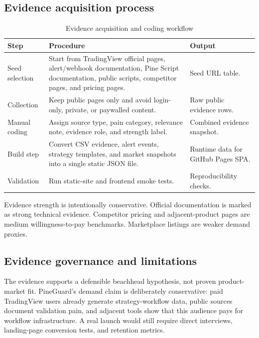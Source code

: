 \documentclass[11pt,a4paper]{article}
\begin{document}
\subsection{Evidence acquisition process}

\begin{table}[H]
\centering
\caption{Evidence acquisition and coding workflow}
\small
\begin{tabularx}{\textwidth}{>{\raggedright\arraybackslash}p{3.0cm}X>{\raggedright\arraybackslash}p{3.1cm}}
\toprule
\textbf{Step} & \textbf{Procedure} & \textbf{Output} \\
\midrule
Seed selection & Start from TradingView official pages, alert/webhook documentation, Pine Script documentation, public scripts, competitor pages, and pricing pages. & Seed URL table. \\
Collection & Keep public pages only and avoid login-only, private, or paywalled content. & Raw public evidence rows. \\
Manual coding & Assign source type, pain category, relevance note, evidence role, and strength label. & Combined evidence snapshot. \\
Build step & Convert CSV evidence, alert events, strategy templates, and market snapshots into a single static JSON file. & Runtime data for GitHub Pages SPA. \\
Validation & Run static-site and frontend smoke tests. & Reproducibility checks. \\
\bottomrule
\end{tabularx}
\end{table}

Evidence strength is intentionally conservative. Official documentation is marked as strong technical evidence. Competitor pricing and adjacent-product pages are medium willingness-to-pay benchmarks. Marketplace listings are weaker demand proxies.

\subsection{Evidence governance and limitations}

The evidence supports a defensible beachhead hypothesis, not proven product-market fit. PineGuard's demand claim is deliberately conservative: paid TradingView users already generate strategy-workflow data, public sources document validation pain, and adjacent tools show that this audience pays for workflow infrastructure. A real launch would still require direct interviews, landing-page conversion tests, and retention metrics.
\end{document}

